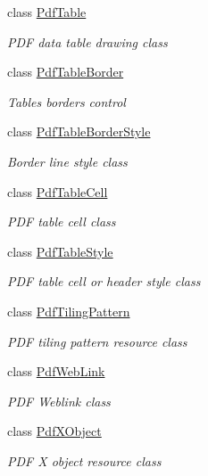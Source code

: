 \begin{DoxyCompactItemize}
class \hyperlink{class_pdf_file_writer_1_1_pdf_table}{Pdf\+Table}
\begin{DoxyCompactList}\small\item\em P\+DF data table drawing class \end{DoxyCompactList}\item 
class \hyperlink{class_pdf_file_writer_1_1_pdf_table_border}{Pdf\+Table\+Border}
\begin{DoxyCompactList}\small\item\em Table\textquotesingle{}s borders control \end{DoxyCompactList}\item 
class \hyperlink{class_pdf_file_writer_1_1_pdf_table_border_style}{Pdf\+Table\+Border\+Style}
\begin{DoxyCompactList}\small\item\em Border line style class \end{DoxyCompactList}\item 
class \hyperlink{class_pdf_file_writer_1_1_pdf_table_cell}{Pdf\+Table\+Cell}
\begin{DoxyCompactList}\small\item\em P\+DF table cell class \end{DoxyCompactList}\item 
class \hyperlink{class_pdf_file_writer_1_1_pdf_table_style}{Pdf\+Table\+Style}
\begin{DoxyCompactList}\small\item\em P\+DF table cell or header style class \end{DoxyCompactList}\item 
class \hyperlink{class_pdf_file_writer_1_1_pdf_tiling_pattern}{Pdf\+Tiling\+Pattern}
\begin{DoxyCompactList}\small\item\em P\+DF tiling pattern resource class \end{DoxyCompactList}\item 
class \hyperlink{class_pdf_file_writer_1_1_pdf_web_link}{Pdf\+Web\+Link}
\begin{DoxyCompactList}\small\item\em P\+DF Weblink class \end{DoxyCompactList}\item 
class \hyperlink{class_pdf_file_writer_1_1_pdf_x_object}{Pdf\+X\+Object}
\begin{DoxyCompactList}\small\item\em P\+DF X object resource class \end{DoxyCompactList}\item 

\end{DoxyCompactItemize}

